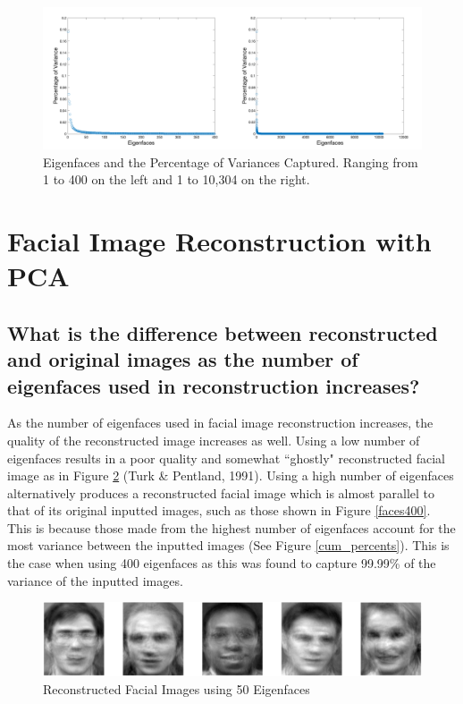 \documentclass[letterpaper,12pt]{article}
\begin{document}
\begin{figure}[htp]
    \centering
    \includegraphics[width=15cm]{graphs2.png}
    \caption{Eigenfaces and the Percentage of Variances Captured. Ranging from 1 to 400 on the left and 1 to 10,304 on the right.}
    \label{cum_percents2}
\end{figure}

\section{Facial Image Reconstruction with PCA}\label{Q2}


\subsection{What is the difference between reconstructed and original images as the number of eigenfaces used in reconstruction increases?}\label{Q2.1}

As the number of eigenfaces used in facial image reconstruction increases, the quality of the reconstructed image increases as well. Using a low number of eigenfaces results in a poor quality and somewhat ``ghostly" reconstructed facial image as in Figure \ref{faces50}  (Turk \& Pentland, 1991). Using a high number of eigenfaces alternatively produces a reconstructed facial image which is almost parallel to that of its original inputted images, such as those shown in Figure \ref{faces400}. This is because those made from the highest number of eigenfaces account for the most variance between the inputted images (See Figure \ref{cum_percents}).  This is the case when using 400 eigenfaces as this was found to capture 99.99\% of the variance of the inputted images. 




\begin{figure}[htp]
    \centering
    \includegraphics[width=15cm]{faces50.png}
    \caption{Reconstructed Facial Images using 50 Eigenfaces}
    \label{faces50}
\end{figure}
\end{document}

